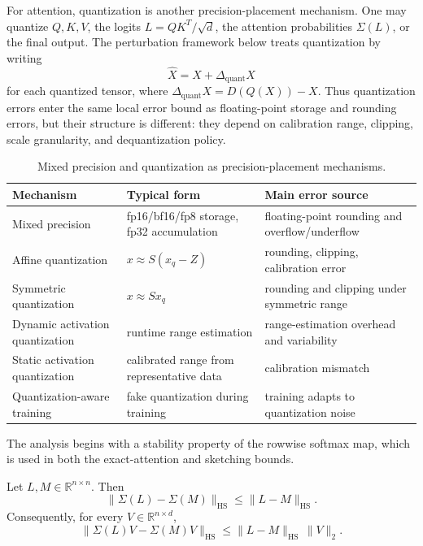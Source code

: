For attention, quantization is another precision-placement mechanism. One may quantize $Q,K,V$, the logits $L = QK^T/\sqrt{d}$, the attention probabilities $\Sigma(L)$, or the final output. The perturbation framework below treats quantization by writing
\[
    \widehat{X} = X + \Delta_{\mathrm{quant}}X
\]
for each quantized tensor, where $\Delta_{\mathrm{quant}}X = D(Q(X)) - X$. Thus quantization errors enter the same local error bound as floating-point storage and rounding errors, but their structure is different: they depend on calibration range, clipping, scale granularity, and dequantization policy.

\begin{table}[ht]
\centering
\caption{Mixed precision and quantization as precision-placement mechanisms.}
\label{tab:mixed-vs-quantization}
\small
\begin{tabular}{lll}
\toprule
Mechanism & Typical form & Main error source \\
\midrule
Mixed precision & fp16/bf16/fp8 storage, fp32 accumulation & floating-point rounding and overflow/underflow \\
Affine quantization & $x \approx S(x_q - Z)$ & rounding, clipping, calibration error \\
Symmetric quantization & $x \approx Sx_q$ & rounding and clipping under symmetric range \\
Dynamic activation quantization & runtime range estimation & range-estimation overhead and variability \\
Static activation quantization & calibrated range from representative data & calibration mismatch \\
Quantization-aware training & fake quantization during training & training adapts to quantization noise \\
\bottomrule
\end{tabular}
\end{table}

The analysis begins with a stability property of the rowwise softmax map, which is used in both the exact-attention and sketching bounds.

\begin{proposition}
    \label{prop:softmax-lipschitz}
    Let $L,M \in \mathbb{R}^{n \times n}$. Then
    \[
        \|\Sigma(L) - \Sigma(M)\|_{\mathrm{HS}} \leq \|L - M\|_{\mathrm{HS}}.
    \]
    Consequently, for every $V \in \mathbb{R}^{n \times d}$,
    \[
        \|\Sigma(L)V - \Sigma(M)V\|_{\mathrm{HS}} \leq \|L - M\|_{\mathrm{HS}}\,\|V\|_2.
    \]
\end{proposition}

